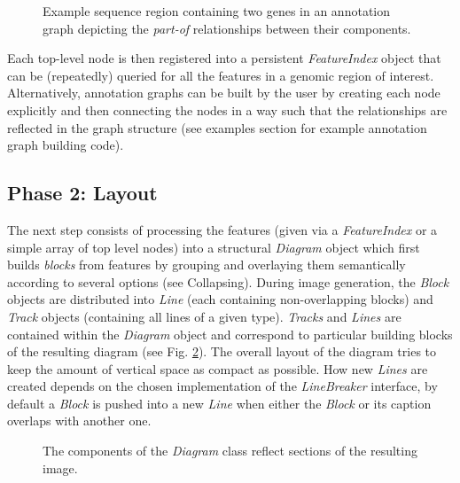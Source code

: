 \documentclass[a4paper]{scrreprt}
\begin{document}
\begin{figure}[ht]
\caption{Example sequence region containing two genes in an annotation graph depicting the \emph{part-of} relationships between their components.}
\label{gfftree}
\end{figure}
Each top-level node is then registered into a persistent \emph{FeatureIndex} object that can be (repeatedly) queried for all the features in a genomic region of interest. Alternatively, annotation graphs can be built by the user by creating each node explicitly and then connecting the nodes in a way such that the relationships are reflected in the graph structure (see examples section for example annotation graph building code).

\subsection{Phase 2: Layout}
The next step consists of processing the features (given via a \emph{FeatureIndex} or a simple array of top level nodes) into a structural \emph{Diagram} object which first builds \emph{blocks} from features by grouping and overlaying them semantically according to several options (see Collapsing). During image generation, the \emph{Block} objects are distributed into \emph{Line} (each containing non-overlapping blocks) and \emph{Track} objects (containing all lines of a given type). \emph{Tracks} and \emph{Lines} are contained within the \emph{Diagram} object and correspond to particular building blocks of the resulting diagram (see Fig. \ref{diagram}). The overall layout of the diagram tries to keep the amount of vertical space as compact as possible. How new \emph{Lines} are created depends on the chosen  implementation of the \emph{LineBreaker} interface, by default a \emph{Block} is pushed into a new \emph{Line} when either the \emph{Block} or its caption overlaps with another one.

\begin{figure}[ht]
\caption{The components of the \emph{Diagram} class reflect sections of the resulting image.}
\label{diagram}
\end{figure}
\end{document}
